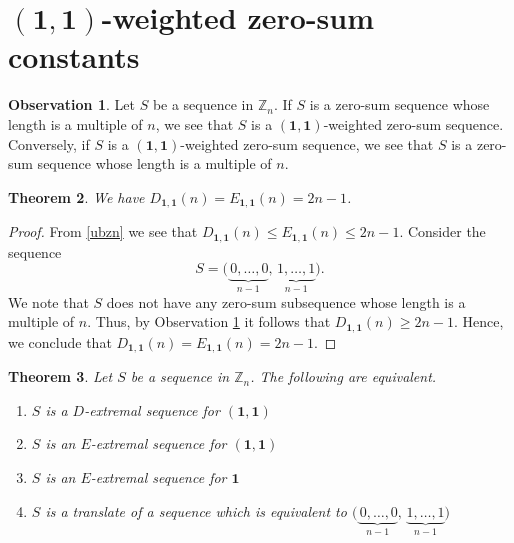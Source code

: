 \documentclass{article}[11pt]
\newtheorem{theorem}{Theorem}[section]
\theoremstyle{definition}
\newtheorem{observation}[theorem]{Observation}
\begin{document}
\section{$(\mathbf 1,\mathbf 1)$-weighted zero-sum constants}


\begin{observation}\label{star}
Let $S$ be a sequence in $\mathbb Z_n$. If $S$ is a zero-sum sequence whose length is a multiple of $n$, we see that $S$ is a $(\mathbf 1,\mathbf 1)$-weighted zero-sum sequence. Conversely, if $S$ is a $(\mathbf 1,\mathbf 1)$-weighted zero-sum sequence, we see that $S$ is a zero-sum sequence whose length is a multiple of $n$.
\end{observation}

\begin{theorem}\label{e'1}
We have $D_{\mathbf 1,\mathbf 1}(n)=E_{\mathbf 1,\mathbf 1}(n)=2n-1$.
\end{theorem}

\begin{proof}
From \eqref{ubzn} we see that $D_{\mathbf 1,\mathbf 1}(n)\leq E_{\mathbf 1,\mathbf 1}(n)\leq 2n-1$. Consider the sequence
\[S=\big(\underbrace{\,0,\ldots,0}_{n-1},\,\underbrace{1,\ldots,1}_{n-1}\big).\]
We note that $S$ does not have any zero-sum subsequence whose length is a multiple of $n$. Thus, by Observation \ref{star} it follows that $D_{\mathbf 1,\mathbf 1}(n)\geq 2n-1$. Hence, we conclude that $D_{\mathbf 1,\mathbf 1}(n)=E_{\mathbf 1,\mathbf 1}(n)=2n-1$.
\end{proof}


\begin{theorem}\label{11}
Let $S$ be a sequence in $\mathbb Z_n$. The following are equivalent.
\begin{enumerate}[label=(\arabic*),ref=(\arabic*)]
\item[$(a)$]
$S$ is a $D$-extremal sequence for $(\mathbf 1,\mathbf 1)$

\item[$(b)$]
$S$ is an $E$-extremal sequence for $(\mathbf 1,\mathbf 1)$

\item[$(c)$]
$S$ is an $E$-extremal sequence for $\mathbf 1$

\item[$(d)$]
$S$ is a translate of a sequence which is equivalent to $\big(\underbrace{\,0,\ldots,0}_{n-1},\,\underbrace{1,\ldots,1}_{n-1}\big)$
\end{enumerate}
\end{theorem}
\end{document}
